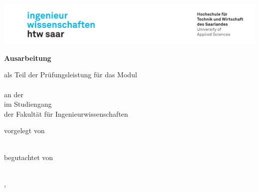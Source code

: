 \begin{titlepage}\linespread{1.5}\selectfont
\includegraphics[width=\linewidth]{Graphics/htwsaar_Logo_inwi_head_VF_4C_crop}
  \begin{center}
    \large  
    \hfill
    \vfill
    \begingroup
      \Large\bfseries Ausarbeitung
    \endgroup
		
		\bigskip
		
    als Teil der Prüfungsleistung für das Modul \\
    \moduleName \\
    an der \myUni \\
    im Studiengang \myDegreeCourse \\
    der Fakultät für Ingenieurwissenschaften \\ 
    
  \vfill
	
  \begingroup
    \Large\bfseries\myTitle 
  \endgroup
	
	\bigskip
	
  vorgelegt von \\
  \firstName \\
  \vfill
	
  begutachtet von \\
  \myFirstProf \\
	
  \vfill
	
  \myLocation, \myTime                   

    \end{center}       
\end{titlepage}   